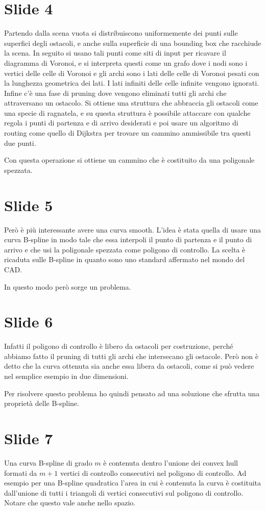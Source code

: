 \documentclass{article}
\begin{document}
\section*{Slide 4}
Partendo dalla scena vuota si distribuiscono uniformemente dei punti
sulle superfici degli ostacoli, e anche sulla superficie di una
bounding box che racchiude la scena. In seguito si usano tali punti
come siti di input per ricavare il diagramma di Voronoi, e si
interpreta questi come un grafo dove i nodi sono i vertici delle celle
di Voronoi e gli archi sono i lati delle celle di Voronoi pesati con
la lunghezza geometrica dei lati. I lati infiniti delle celle infinite
vengono ignorati. Infine c'è una fase di pruning dove vengono
eliminati tutti gli archi che attraversano un ostacolo. Si ottiene una
struttura che abbraccia gli ostacoli come una specie di ragnatela, e
su questa struttura è possibile attaccare con qualche regola i punti
di partenza e di arrivo desiderati e poi usare un algoritmo di routing
come quello di Dijkstra per trovare un cammino ammissibile tra questi
due punti.

Con questa operazione si ottiene un cammino che è costituito da una
poligonale spezzata.

\section*{Slide 5}
Però è più interessante avere una curva smooth. L'idea è stata quella
di usare una curva B-spline in modo tale che essa interpoli il punto
di partenza e il punto di arrivo e che usi la poligonale spezzata come
poligono di controllo. La scelta è ricaduta sulle B-spline in quanto
sono uno standard affermato nel mondo del CAD.

In questo modo però sorge un problema.

\section*{Slide 6}
Infatti il poligono di controllo è libero da ostacoli per costruzione,
perché abbiamo fatto il pruning di tutti gli archi che intersecano
gli ostacole. Però non è detto che la curva ottenuta sia anche essa
libera da ostacoli, come si può vedere nel semplice esempio in due
dimensioni.

Per risolvere questo problema ho quindi pensato ad una soluzione che
sfrutta una proprietà delle B-spline.

\section*{Slide 7}
Una curva B-spline di grado $m$ è contenuta dentro l'unione dei convex
hull formati da $m+1$ vertici di controllo consecutivi nel poligono di
controllo. Ad esempio per una B-spline quadratica l'area in cui è
contenuta la curva è costituita dall'unione di tutti i triangoli di
vertici consecutivi sul poligono di controllo. Notare che questo vale
anche nello spazio.
\end{document}
